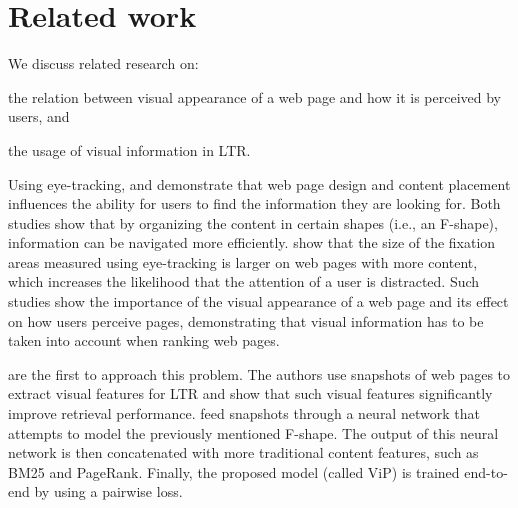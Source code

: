 
\section{Related work}
\label{sec:relatedwork}

We discuss related research on:
\begin{inparaenum}[(i)]
\item the relation between visual appearance of a web page and how it is perceived by users, and
\item the usage of visual information in \ac{LTR}.
\end{inparaenum} 


Using eye-tracking, \citet{nielsen2006f} and \citet{pernice2017f} demonstrate that web page design and content placement influences the ability for users to find the information they are looking for. 
Both studies show that by organizing the content in certain shapes (i.e., an F-shape), information can be  navigated more efficiently.
\citet{wang2014eye} show that the size of the fixation areas measured using eye-tracking is larger on web pages with more content, which increases the likelihood that the attention of a user is distracted.
Such studies show the importance of the visual appearance of a web page and its effect on how users perceive pages, demonstrating that visual information has to be taken into account when ranking web pages.

\citet{fan2017learning} are the first to approach this problem.
The authors use snapshots of web pages to extract visual features for LTR
and show that such visual features significantly improve retrieval performance.
\citet{fan2017learning} feed snapshots through a neural network that attempts to model the previously mentioned F-shape.
The output of this neural network is then concatenated with more traditional content features, such as BM25 and PageRank.
Finally, the proposed model (called ViP) is trained end-to-end by using a pairwise loss.

